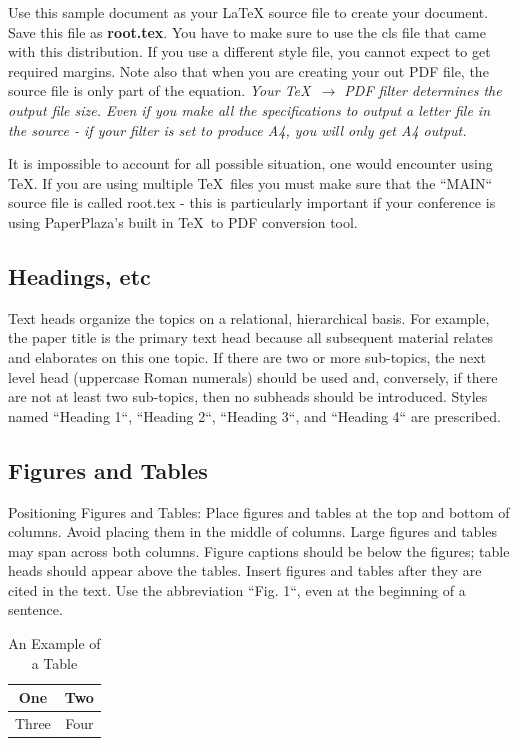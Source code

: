 \documentclass[letterpaper, 10 pt, conference]{ieeeconf}
\begin{document}
Use this sample document as your LaTeX source file to create your document. Save this file as {\bf root.tex}. You have to make sure to use the cls file that came with this distribution. If you use a different style file, you cannot expect to get required margins. Note also that when you are creating your out PDF file, the source file is only part of the equation. {\it Your \TeX\ $\rightarrow$ PDF filter determines the output file size. Even if you make all the specifications to output a letter file in the source - if your filter is set to produce A4, you will only get A4 output. }

It is impossible to account for all possible situation, one would encounter using \TeX. If you are using multiple \TeX\ files you must make sure that the ``MAIN`` source file is called root.tex - this is particularly important if your conference is using PaperPlaza's built in \TeX\ to PDF conversion tool.

\subsection{Headings, etc}

Text heads organize the topics on a relational, hierarchical basis. For example, the paper title is the primary text head because all subsequent material relates and elaborates on this one topic. If there are two or more sub-topics, the next level head (uppercase Roman numerals) should be used and, conversely, if there are not at least two sub-topics, then no subheads should be introduced. Styles named ``Heading 1``, ``Heading 2``, ``Heading 3``, and ``Heading 4`` are prescribed.

\subsection{Figures and Tables}

Positioning Figures and Tables: Place figures and tables at the top and bottom of columns. Avoid placing them in the middle of columns. Large figures and tables may span across both columns. Figure captions should be below the figures; table heads should appear above the tables. Insert figures and tables after they are cited in the text. Use the abbreviation ``Fig. 1``, even at the beginning of a sentence.

\begin{table}[h]
\caption{An Example of a Table}
\label{table_example}
\begin{center}
\begin{tabular}{|c||c|}
\hline
One & Two\\
\hline
Three & Four\\
\hline
\end{tabular}
\end{center}
\end{table}
\end{document}
